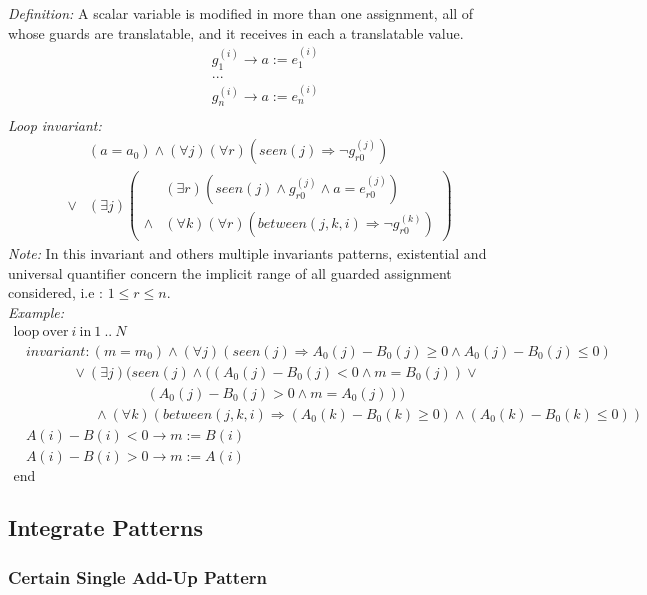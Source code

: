 \documentclass[a4paper,10pt]{article}
\newcommand{\idx}{\ensuremath{i}\xspace}
\newcommand{\at}[1]{{(#1)}}
\newcommand{\KWloop}{\ensuremath{\mathrm{loop}~}}
\newcommand{\KWend}{\ensuremath{\mathrm{end}~}}
\newcommand{\KWover}{\ensuremath{\mathrm{over}~}}
\newcommand{\KWin}{\ensuremath{~\mathrm{in}~}}
\newcommand{\impl}{\ensuremath{\Longrightarrow}}
\newcommand{\seen}[1]{\ensuremath{\mathit{seen}(#1)}\xspace}
\newcommand{\between}[3]{\ensuremath{\mathit{between}{(#1,#2,#3)}}\xspace}
\newcommand{\loopinvariant}{\noindent\textit{Loop invariant:}\xspace}
\newcommand{\patterndef}{\noindent\textit{Definition:}\xspace}
\newcommand{\patternexample}{\noindent\textit{Example:}\xspace}
\newcommand{\patternnote}{\noindent\textit{Note:}\xspace}
\begin{document}
\patterndef A scalar variable is modified in more than one assignment, all of
whose guards are translatable, and it receives in each a translatable value.
%
\begin{eqnarray*}
&g_1^\at{\idx} \rightarrow a := e_1^\at{\idx}\\
&...\\
&g_n^\at{\idx} \rightarrow a := e_n^\at{\idx}\\
\end{eqnarray*}
%
\loopinvariant
%
\begin{eqnarray*}
&(a = a_0) \land (\forall j)(\forall r)(\seen{j} \impl \neg g_{r0}^\at{j})\\
\lor 
& (\exists j)
\left(\begin{array}{cl}
&(\exists r)(\seen{j} \land g_{r0}^\at{j} \land a = e_{r0}^\at{j})\\
\land&  (\forall k)(\forall r) (\between{j}{k}{\idx} \impl \neg g_{r0}^\at{k})
\end{array}\right)
\end{eqnarray*}
%
\patternnote In this invariant and others multiple invariants patterns, 
existential and universal quantifier concern the implicit range of all 
guarded assignment considered, i.e : $1 \leq r \leq n$.\\
%
\patternexample
$$\begin{array}{l}
  \KWloop \KWover i \KWin 1~..~N \\
  ~~~~ \textit{invariant}: (m = m_0) \land (\forall j)(\seen{j} \impl A_0(j)-B_0(j) \geq 0 \land A_0(j)-B_0(j) \leq 0)\\
  ~~~~~~~~~~~~~~~~~~~ \lor (\exists j)(\seen{j} \land ((A_0(j)-B_0(j) < 0 \land m = B_0(j)) \lor\\
  ~~~~~~~~~~~~~~~~~~~~~~~~~~~~~~~~~~~~~~~~~~~ (A_0(j)-B_0(j) > 0 \land m = A_0(j)))\\
  ~~~~~~~~~~~~~~~~~~~~~~~~~~ \land (\forall k)(\between{j}{k}{\idx} \impl (A_0(k)-B_0(k) \geq 0) \land (A_0(k)-B_0(k) \leq 0))\\
  ~~~~ A(i)-B(i) < 0 \rightarrow m := B(i)\\
  ~~~~ A(i)-B(i) > 0 \rightarrow m := A(i)\\
  \KWend
\end{array}$$

\subsection{Integrate Patterns}

\subsubsection*{Certain Single Add-Up Pattern}
\end{document}
